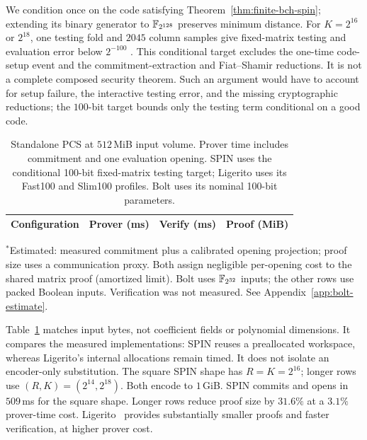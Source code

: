 We condition once on the code satisfying
Theorem~\ref{thm:finite-bch-spin}; extending its binary generator to
$\mathbb F_{2^{128}}$ preserves minimum distance.
For $K=2^{16}$ or $2^{18}$, one testing fold and $2045$ column samples give
fixed-matrix testing and evaluation error below $2^{-100}$
\cite{diamondPosen24}. This conditional target excludes the one-time
code-setup event and the commitment-extraction and Fiat--Shamir reductions.
It is not a complete composed security theorem. Such an argument would
have to account for setup failure, the interactive testing error, and the
missing cryptographic reductions; the $100$-bit target bounds only the
testing term conditional on a good code.

\begin{table}[!htbp]
\centering
\caption{Standalone PCS at $512$\,MiB input volume. Prover time includes
commitment and one evaluation opening. SPIN uses the conditional 100-bit
fixed-matrix testing target; Ligerito uses its Fast100 and Slim100 profiles. Bolt uses its
nominal 100-bit parameters.}
\label{tab:spin-pcs-standalone}
\small
\begin{tabular}{@{}lrrr@{}}
\toprule
Configuration & Prover (ms) & Verify (ms) & Proof (MiB) \\
\midrule

\end{tabular}
\par\smallskip
\begin{minipage}{\linewidth}\footnotesize
$^{*}$Estimated: measured commitment plus a calibrated opening projection;
proof size uses a communication proxy. Both assign negligible per-opening
cost to the shared matrix proof (amortized limit). Bolt uses
$\mathbb F_{2^{32}}$ inputs; the other rows use packed Boolean inputs.
Verification was not measured. See Appendix~\ref{app:bolt-estimate}.
\end{minipage}
\end{table}

Table~\ref{tab:spin-pcs-standalone} matches input bytes, not coefficient
fields or polynomial dimensions. It compares the measured implementations:
SPIN reuses a preallocated workspace, whereas Ligerito's internal
allocations remain timed. It does not isolate an encoder-only substitution.
The square SPIN shape has $R=K=2^{16}$; longer rows use
$(R,K)=(2^{14},2^{18})$. Both encode to $1$\,GiB.
SPIN commits and opens in $509$\,ms for the square shape.
Longer rows reduce proof size by $31.6\%$ at a $3.1\%$ prover-time cost.
Ligerito~\cite{ligerito25} provides substantially smaller proofs and
faster verification, at higher prover cost.

